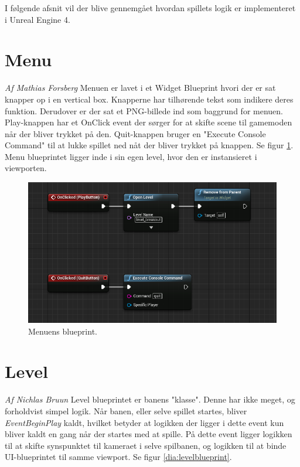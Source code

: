 I følgende afsnit vil der blive gennemgået hvordan spillets logik er implementeret i Unreal Engine 4.

\section{Menu}
\textit{Af Mathias Forsberg}\newline
Menuen er lavet i et Widget Blueprint hvori der er sat knapper op i en vertical box. Knapperne har tilhørende tekst som indikere deres funktion. Derudover er der sat et PNG-billede ind som baggrund for menuen. Play-knappen har et OnClick event der sørger for at skifte scene til gamemoden når der bliver trykket på den. Quit-knappen bruger en "Execute Console Command" til at lukke spillet ned nåt der bliver trykket på knappen. Se figur \ref{dia:menublueprint}. Menu blueprintet ligger inde i sin egen level, hvor den er instansieret i viewporten.

\begin{figure}
	\begin{center}
		\caption{Menuens blueprint.}
		\label{dia:menublueprint}
		\includegraphics[width=0.80\linewidth]{pictures/blueprints/menu_blueprint}
	\end{center}
\end{figure}

\section{Level}
\textit{Af Nichlas Bruun}\newline
Level blueprintet er banens "klasse". Denne har ikke meget, og forholdvist simpel logik. Når banen, eller selve spillet startes, bliver \textit{EventBeginPlay} kaldt, hvilket betyder at logikken der ligger i dette event kun bliver kaldt en gang når der startes med at spille. På dette event ligger logikken til at skifte synspunktet til kameraet i selve spilbanen, og logikken til at binde UI-blueprintet til samme viewport. Se figur \ref{dia:levelblueprint}.


